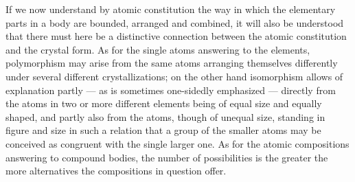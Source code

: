 \documentclass[12pt,a4paper]{book}
\begin{document}
If we now understand by atomic constitution the way in which the elementary
parts in a body are bounded, arranged and combined, it will also be understood
that there must here be a distinctive connection between the atomic
constitution and the crystal form. As for the single atoms answering to the
elements, polymorphism may arise from the same atoms arranging themselves
differently under several different crystallizations; on the other hand
isomorphism allows of explanation partly --- as is sometimes one-sidedly
emphasized --- directly from the atoms in two or more different elements being
of equal size and equally shaped, and partly also from the atoms, though of
unequal size, standing in figure and size in such a relation that a group of
the smaller atoms may be conceived as congruent with the single larger one. As
for the atomic compositions answering to compound bodies, the number of
possibilities is the greater the more alternatives the compositions in question
offer.
\end{document}
